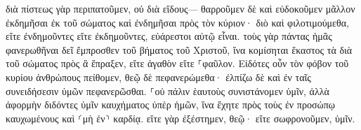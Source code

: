 \documentclass{openreader}
\begin{document}
διὰ πίστεως γὰρ περιπατοῦμεν, οὐ διὰ εἴδους— 
θαρροῦμεν δὲ καὶ εὐδοκοῦμεν μᾶλλον ἐκδημῆσαι ἐκ τοῦ σώματος καὶ ἐνδημῆσαι πρὸς τὸν κύριον· 
διὸ καὶ φιλοτιμούμεθα, εἴτε ἐνδημοῦντες εἴτε ἐκδημοῦντες, εὐάρεστοι αὐτῷ εἶναι. 
τοὺς γὰρ πάντας ἡμᾶς φανερωθῆναι δεῖ ἔμπροσθεν τοῦ βήματος τοῦ Χριστοῦ, ἵνα κομίσηται ἕκαστος τὰ διὰ τοῦ σώματος πρὸς ἃ ἔπραξεν, εἴτε ἀγαθὸν εἴτε ⸀φαῦλον. 
Εἰδότες οὖν τὸν φόβον τοῦ κυρίου ἀνθρώπους πείθομεν, θεῷ δὲ πεφανερώμεθα· ἐλπίζω δὲ καὶ ἐν ταῖς συνειδήσεσιν ὑμῶν πεφανερῶσθαι. 
⸀οὐ πάλιν ἑαυτοὺς συνιστάνομεν ὑμῖν, ἀλλὰ ἀφορμὴν διδόντες ὑμῖν καυχήματος ὑπὲρ ἡμῶν, ἵνα ἔχητε πρὸς τοὺς ἐν προσώπῳ καυχωμένους καὶ ⸂μὴ ἐν⸃ καρδίᾳ. 
εἴτε γὰρ ἐξέστημεν, θεῷ· εἴτε σωφρονοῦμεν, ὑμῖν. 
\end{document}

